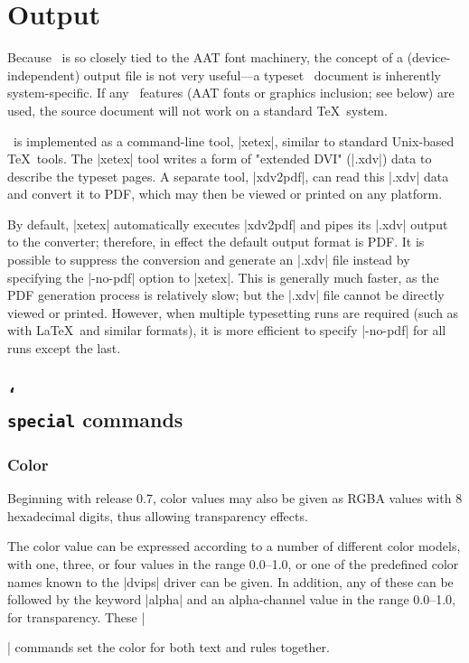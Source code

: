 \section{Output}

Because \XeTeX\ is so closely tied to the AAT font machinery, the concept of a  (device-independent) output file is not very useful—a typeset \XeTeX\ document is inherently system-specific. If any \XeTeX\ features (AAT fonts or graphics inclusion; see below) are used, the source document will not work on a standard \TeX\ system.

\XeTeX\ is implemented as a command-line tool, |xetex|, similar to standard Unix-based \TeX\ tools. The |xetex| tool writes a form of "extended DVI" (|.xdv|) data to describe the typeset pages. A separate tool, |xdv2pdf|, can read this |.xdv| data and convert it to PDF, which may then be viewed or printed on any platform.

By default, |xetex| automatically executes |xdv2pdf| and pipes its |.xdv| output to the converter; therefore, in effect the default output format is PDF. It is possible to suppress the conversion and generate an |.xdv| file instead by specifying the |-no-pdf| option to |xetex|. This is generally much faster, as the PDF generation process is relatively slow; but the |.xdv| file cannot be directly viewed or printed. However, when multiple typesetting runs are required (such as with \LaTeX\ and similar formats), it is more efficient to specify |-no-pdf| for all runs except the last.

\subsection{\texttt{\char`\\special} commands}

\subsubsection{Color}


Beginning with release 0.7, color values may also be given as RGBA values with 8 hexadecimal digits, thus allowing transparency effects.


The color value can be expressed according to a number of different color models, with one, three, or four values in the range 0.0–1.0, or one of the predefined color names known to the |dvips| driver can be given. In addition, any of these can be followed by the keyword |alpha| and an alpha-channel value in the range 0.0–1.0, for transparency. These |\special| commands set the color for both text and rules together.

